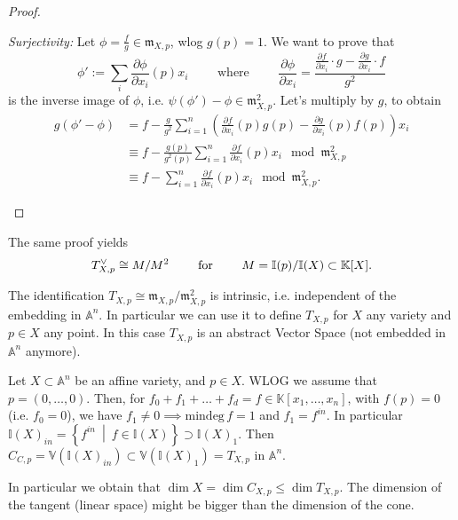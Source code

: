 \begin{proof}
\begin{description}
		\textit{Surjectivity:} Let $\phi = \frac{f}{g} \in \mathfrak{m}_{X,p}$, wlog $g(p) = 1$.
		We want to prove that
		\begin{equation}
			\phi' := \sum_{i}^{} \frac{\partial \phi}{\partial x_i} (p) x_i
			\qquad \text{ where } \qquad
			\frac{\partial \phi}{\partial x_i} =
			\frac{\frac{\partial f}{\partial x_i} \cdot g - \frac{\partial g}{\partial x_i} \cdot f }{g^2}
		\end{equation} 
		is the inverse image of $\phi$, i.e. $\psi(\phi') - \phi \in \mathfrak{m}^2_{X,p}$.
		Let's multiply by $g$, to obtain
		\begin{align}
			g \left( \phi' - \phi  \right) &=
			f - \frac{g}{g^2} \sum_{i = 1}^{n} \left( \frac{\partial f}{\partial x_i} (p) g(p) -
			\frac{\partial g}{\partial x_i} (p) f(p) \right)x_i\\
			&\equiv f - \frac{g(p)}{g^2(p)} \sum_{i=1}^{n} \frac{\partial f}{\partial x_i} (p) x_i
			\mod \mathfrak{m}^2_{X,p}\\
			&\equiv f - \sum_{i=1}^{n} \frac{\partial f}{\partial x_i} (p) x_i \mod \mathfrak{m}^2_{X,p}
		.\end{align} 
\end{description} 
\end{proof}

\begin{rem}[]
	The same proof yields
	\begin{equation}
	T_{X,p}^{\vee} \cong M/M^2 \qquad \text{ for } \qquad
	M = \mathbb{I}(p)/\mathbb{I}(X) \subset \mathbb{K}[X]
	.\end{equation} 
\end{rem}
\begin{rem}[]
	The identification $T_{X,p} \cong \mathfrak{m}_{X,p}/\mathfrak{m}^2_{X,p}$ is
	intrinsic, i.e. independent of the embedding in $\mathbb{A}^{n}$.
	In particular we can use it to define $T_{X,p}$ for $X$ any
	variety and $p \in X$ any point.
	In this case $T_{X,p}$ is an abstract Vector Space (not
	embedded in $\mathbb{A}^{n}$ anymore).
\end{rem}
 
\begin{rem}
	Let $X \subset \mathbb{A}^{n}$ be an affine variety, and $p \in X$.
	WLOG we assume that $p = \left( 0, \ldots, 0 \right)$.
	Then, for $f_0 + f_1 + \ldots + f_d = f \in \mathbb{K}\left[x_1, \ldots, x_n \right]$,
	with $f(p) = 0$ (i.e. $f_0 = 0$), we have
	$f_1 \neq 0 \implies \mathrm{mindeg}\, f = 1$ and $f_1 = f^{in}$.
	In particular $\mathbb{I}\left( X \right)_{in} = \left\{ f^{in} \ \middle|\ 
	f \in \mathbb{I}\left( X \right) \right\} \supset \mathbb{I}\left( X \right)_1$.
	Then $C_{C,p} = \mathbb{V}\left( \mathbb{I}\left( X \right)_{in} \right) \subset
	\mathbb{V}\left( \mathbb{I}\left( X \right)_1 \right) = T_{X,p}$ in $\mathbb{A}^{n}$.

	In particular we obtain that $\dim X = \dim C_{X,p} \leq \dim T_{X,p}$.
	The dimension of the tangent (linear space) might be bigger than the dimension of the cone.
\end{rem}

